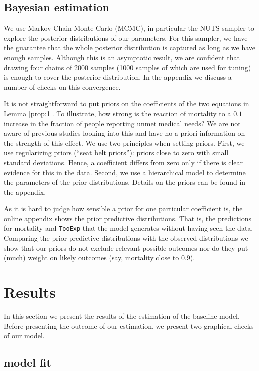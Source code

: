 \documentclass[a4paper,12pt]{article}
\begin{document}
\subsection{Bayesian estimation}
\label{sec:org3ee266f}

We use Markov Chain Monte Carlo (MCMC), in particular the NUTS sampler to explore the posterior distributions of our parameters. For this sampler, we have the guarantee that the whole posterior distribution is captured as long as we have enough samples. Although this is an asymptotic result, we are confident that drawing four chains of 2000 samples (1000 samples of which are used for tuning) is enough to cover the posterior distribution. In the appendix we discuss a number of checks on this convergence.

It is not straightforward to put priors on the coefficients of the two equations in Lemma \ref{prop:1}. To illustrate, how strong is the reaction of mortality to a \(0.1\) increase in the fraction of people reporting unmet medical needs? We are not aware of previous studies looking into this and have no a priori information on the strength of this effect. We use two principles when setting priors. First, we use regularizing priors (``seat belt priors''): priors close to zero with small standard deviations. Hence, a coefficient differs from zero only if there is clear evidence for this in the data. Second, we use a hierarchical model to determine the parameters of the prior distributions. Details on the priors can be found in the appendix.

As it is hard to judge how sensible a prior for one particular coefficient is, the online appendix shows the prior predictive distributions. That is, the predictions for mortality and \texttt{TooExp} that the model generates without having seen the data. Comparing the prior predictive distributions with the observed distributions we show that our priors do not exclude relevant possible outcomes nor do they put (much) weight on likely outcomes (say, mortality close to 0.9).

\section{Results}
\label{sec:org92f2fa2}

In this section we present the results of the estimation of the baseline model. Before presenting the outcome of our estimation, we present two graphical  checks of our model.

\subsection{model fit}
\label{sec:org5d91586}
\end{document}
